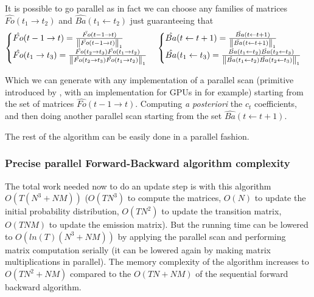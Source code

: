It is possible to go parallel as in fact we can choose any families of matrices $\hat{Fo}(t_1 \rightarrow t_2)$ and $\hat{Ba}(t_1 \leftarrow t_2)$ just guaranteeing that
\begin{equation}
\begin{cases}
\hat{Fo}( t - 1 \rightarrow t) = \frac{\bar{Fo}( t - 1 \rightarrow t)}{\left\lVert\bar{Fo}( t - 1 \rightarrow t)\right\rVert_1} & \\
\hat{Fo}( t_1 \rightarrow t_3) =   \frac{\hat{Fo}( t_2 \rightarrow t_3) \hat{Fo}( t_1 \rightarrow t_2)}{\left\lVert\hat{Fo}( t_2 \rightarrow t_3) \hat{Fo}( t_1 \rightarrow t_2)\right\rVert_1}& \\
\end{cases}
\begin{cases}
\hat{Ba}(t \leftarrow t+1) = \frac{\bar{Ba}(t \leftarrow t+1)}{\left\lVert\bar{Ba}(t \leftarrow t+1)\right\rVert_1} & \\
\hat{Ba}(t_1 \leftarrow t_3) = \frac{\hat{Ba}(t_1 \leftarrow t_2) \hat{Ba}(t_2 \leftarrow t_3)}{\left\lVert\hat{Ba}(t_1 \leftarrow t_2) \hat{Ba}(t_2 \leftarrow t_3)\right\rVert_1} & \\
\end{cases}
\end{equation}

Which we can generate with any implementation of a parallel scan (primitive introduced by \cite{blelloch1990prefix}, with an implementation for GPUs in \cite{sengupta2008efficient} for example) starting from the set of matrices $\hat{Fo}( t - 1 \rightarrow t)$. Computing \emph{a posteriori} the $c_t$ coefficients, and then doing another parallel scan starting from the set $\hat{Ba}(t \leftarrow t+1)$.

The rest of the algorithm can be easily done in a parallel fashion.

\subsubsection*{Precise parallel Forward-Backward algorithm complexity}
The total work needed now to do an update step is with this algorithm $O(T(N^3 + NM))$ ($O(TN^3)$ to compute the matrices, $O(N)$ to update the initial probability distribution, $O(TN^2)$ to update the transition matrix, $O(TNM)$ to update the emission matrix). But the running time can be lowered to $O(ln(T)(N^3 + NM))$ by applying the parallel scan and performing matrix computation serially (it can be lowered again by making matrix multiplications in parallel).
The memory complexity of the algorithm increases to $O(TN^2 + NM)$ compared to the $O(TN + NM)$ of the sequential forward backward algorithm.

